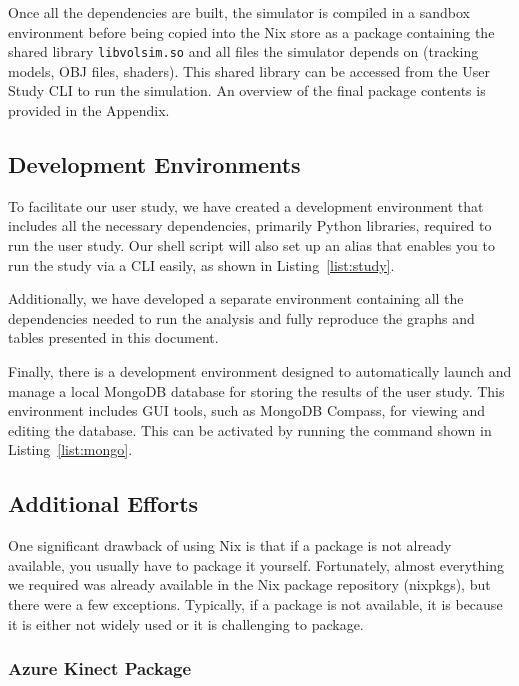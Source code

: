 Once all the dependencies are built, the simulator is compiled in a sandbox environment before being copied into the Nix store as a package containing the shared library \texttt{libvolsim.so} and all files the simulator depends on (tracking models, OBJ files, shaders). This shared library can be accessed from the User Study CLI to run the simulation. An overview of the final package contents is provided in the Appendix.

\subsection{Development Environments}

To facilitate our user study, we have created a development environment that includes all the necessary dependencies, primarily Python libraries, required to run the user study. Our shell script will also set up an alias that enables you to run the study via a CLI easily, as shown in Listing~\ref{list:study}.


Additionally, we have developed a separate environment containing all the dependencies needed to run the analysis and fully reproduce the graphs and tables presented in this document. 

Finally, there is a development environment designed to automatically launch and manage a local MongoDB database for storing the results of the user study. This environment includes GUI tools, such as MongoDB Compass, for viewing and editing the database. This can be activated by running the command shown in Listing~\ref{list:mongo}.


\subsection{Additional Efforts}

One significant drawback of using Nix is that if a package is not already available, you usually have to package it yourself. Fortunately, almost everything we required was already available in the Nix package repository (nixpkgs), but there were a few exceptions. Typically, if a package is not available, it is because it is either not widely used or it is challenging to package.

\subsubsection{Azure Kinect Package}

